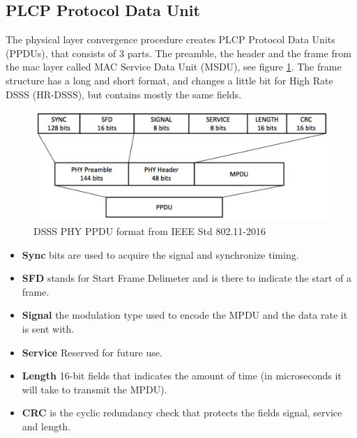 	\subsection{PLCP Protocol Data Unit}
	The physical layer convergence procedure creates PLCP Protocol Data Units (PPDUs), 
	that consists of 3 parts. The preamble, the header and the frame from the mac layer
	called MAC Service Data Unit (MSDU), see figure \ref{fig:PPDU}. The frame structure
	has a long and short format, and changes a little bit for High Rate DSSS (HR-DSSS),
	but contains mostly the same fields.

	\begin{figure}
	\center
	\includegraphics[scale=0.5]{Images/PPDU.png}
	\caption{DSSS PHY PPDU format from IEEE Std 802.11-2016  }
	\label{fig:PPDU}
	\end{figure}


	\begin{itemize}
	\item \textbf{Sync} bits are used to acquire the signal and synchronize timing. 
	\item \textbf{SFD} stands for Start Frame Delimeter and is there to indicate the start of a frame.  
	\item \textbf{Signal} the modulation type used to encode the MPDU and
	the data rate it is sent with. 
	\item \textbf{Service} Reserved for future use. 
	\item \textbf{Length} 16-bit fields that indicates the amount of time (in
			microseconds it will take to transmit the MPDU).
	\item \textbf{CRC} is the cyclic redundancy check that protects
	the fields signal, service and length. 
	\end{itemize}

